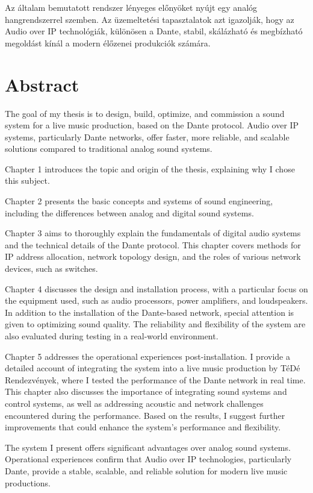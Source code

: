 Az általam bemutatott rendszer lényeges előnyöket nyújt egy analóg 
hangrendszerrel szemben.
Az üzemeltetési tapasztalatok azt igazolják, hogy 
az Audio over IP technológiák, különösen a Dante, 
stabil, skálázható és megbízható megoldást 
kínál a modern élőzenei produkciók számára.


\vfill
\selectenglish


\chapter*{Abstract}

The goal of my thesis is to design, build, optimize, and commission a sound system for 
a live music production, based on the Dante protocol. Audio over IP systems, 
particularly Dante networks, offer faster, more reliable, and scalable 
solutions compared to traditional analog sound systems.

Chapter 1 introduces the topic and origin of the thesis, explaining why I chose this subject.

Chapter 2 presents the basic concepts and systems of sound engineering, including 
the differences between analog and digital sound systems.

Chapter 3 aims to thoroughly explain the fundamentals of digital audio systems and 
the technical details of the Dante protocol. This chapter covers methods for IP 
address allocation, network topology design, and the roles of various network devices, such as switches.

Chapter 4 discusses the design and installation process, with a particular focus on 
the equipment used, such as audio processors, power amplifiers, and loudspeakers. 
In addition to the installation of the Dante-based network, special attention is given to optimizing sound quality. The reliability and flexibility of the system are also evaluated during testing in a real-world environment.

Chapter 5 addresses the operational experiences post-installation. I provide a 
detailed account of integrating the system into a live music production 
by TéDé Rendezvények, where I tested the performance of the Dante network in real time. 
This chapter also discusses the importance of integrating sound systems and 
control systems, as well as addressing acoustic and network challenges 
encountered during the performance. Based on the results, I suggest further 
improvements that could enhance the system's performance and flexibility.

The system I present offers significant advantages over analog sound systems. 
Operational experiences confirm that Audio over IP technologies, particularly Dante, provide a stable, scalable, and reliable solution for modern live music productions.

\vfill
\selectthesislanguage

\setcounter{romanPage}{\value{page}}
